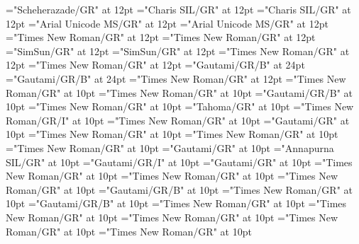 \documentclass[a4paper]{article}
\begin{document}
\font\spanur="Scheherazade/GR" at 12pt
\font\divvi="Charis SIL/GR" at 12pt
\font\spanvi="Charis SIL/GR" at 12pt
\font\divwbr="Arial Unicode MS/GR" at 12pt
\font\spanwbr="Arial Unicode MS/GR" at 12pt
\font\divwtm="Times New Roman/GR" at 12pt
\font\spanwtm="Times New Roman/GR" at 12pt
\font\divzhCN="SimSun/GR" at 12pt
\font\spanzhCN="SimSun/GR" at 12pt
\font{}="Times New Roman/GR" at 12pt
\font\spletHeaddicBody="Times New Roman/GR" at 12pt
\font{}="Gautami/GR/B" at 24pt
\font{}="Gautami/GR/B" at 24pt
\font{}="Times New Roman/GR" at 12pt
\font\entryletDatadicBody="Times New Roman/GR" at 10pt
\font\spentryletDatadicBody="Times New Roman/GR" at 10pt
\font\headwordggoTeluINentryletDatadicBody="Gautami/GR/B" at 10pt
\font\pronunciationenentryletDatadicBody="Times New Roman/GR" at 10pt
\font\pronunciationggofonipaxemicentryletDatadicBody="Tahoma/GR" at 10pt
\font\partofspeechenentryletDatadicBody="Times New Roman/GR/I" at 10pt
\font{}="Times New Roman/GR" at 10pt
\font\LexSensepublishStemGlossPubLdteentryletDatadicBody="Gautami/GR" at 10pt
\font\partofspeechcenentryletDatadicBody="Times New Roman/GR" at 10pt
\font\xsensenumberutfientryletDatadicBody="Times New Roman/GR" at 10pt
\font\xsensenumbercutfientryletDatadicBody="Times New Roman/GR" at 10pt
\font\xitemteentryletDatadicBody="Gautami/GR" at 10pt
\font\xitemhientryletDatadicBody="Annapurna SIL/GR" at 10pt
\font\exampleggoTeluINentryletDatadicBody="Gautami/GR/I" at 10pt
\font\translationLdteentryletDatadicBody="Gautami/GR" at 10pt
\font\primaryrefsenentryletDatadicBody="Times New Roman/GR" at 10pt
\font\LexEntryTypepublishStemEntryTypeAbbreviationPubenentryletDatadicBody="Times New Roman/GR" at 10pt
\font\aentryletDatadicBody="Times New Roman/GR" at 10pt
\font\LexEntrypublishStemComponentTargetHeadWordRefggoTeluINaentryletDatadicBody="Gautami/GR/B" at 10pt
\font\LexEntryTypepublishStemComplexFormTypeReverseAbbrPubenentryletDatadicBody="Times New Roman/GR" at 10pt
\font\complexformformggoTeluINentryletDatadicBody="Gautami/GR/B" at 10pt
\font\pictureRightentryletDatadicBody="Times New Roman/GR" at 10pt
\font\picturepictureRightentryletDatadicBody="Times New Roman/GR" at 10pt
\font\pictureCaptionpictureRightentryletDatadicBody="Times New Roman/GR" at 10pt
\font\CmPicturepublishStemPileThumbnailPubpictureCaptionpictureRightentryletDatadicBody="Times New Roman/GR" at 10pt
\font\spCmPicturepublishStemPileThumbnailPubpictureCaptionpictureRightentryletDatadicBody="Times New Roman/GR" at 10pt
\end{document}
